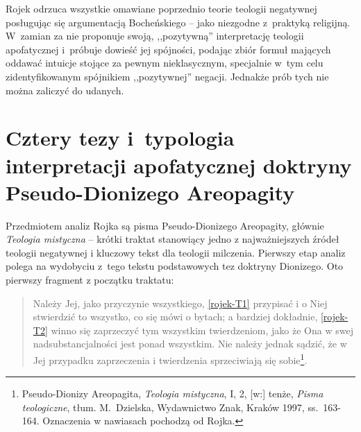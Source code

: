 Rojek odrzuca wszystkie omawiane poprzednio teorie teologii negatywnej posługując się argumentacją Bocheńskiego -- jako niezgodne z~praktyką religijną. W~zamian za nie proponuje swoją, ,,pozytywną'' interpretację teologii apofatycznej i~próbuje dowieść jej spójności, podając zbiór formuł mających oddawać intuicje stojące za pewnym nieklasycznym, specjalnie w~tym celu zidentyfikowanym spójnikiem ,,pozytywnej'' negacji. Jednakże prób tych nie można zaliczyć do udanych.







\section{Cztery tezy i~typologia interpretacji apofatycznej doktryny Pseudo-Dionizego Areopagity}

Przedmiotem analiz Rojka są pisma Pseudo-Dionizego Areopagity, głównie
\textit{Teologia mistyczna} -- krótki traktat stanowiący jedno z najważniejszych
źródeł teologii negatywnej i kluczowy tekst dla teologii milczenia.
Pierwszy etap analiz polega na wydobyciu z~tego tekstu podstawowych tez
doktryny Dionizego. Oto pierwszy fragment z początku traktatu:

\begin{quote}
    Należy Jej, jako przyczynie wszystkiego, \eqref{rojek-T1} przypisać i o Niej
stwierdzić to wszystko, co się mówi o bytach; a bardziej dokładnie,
\eqref{rojek-T2} winno się zaprzeczyć tym wszystkim twierdzeniom, jako że Ona w
swej nadsubstancjalności jest ponad wszystkim. Nie należy jednak
sądzić, że w Jej przypadku zaprzeczenia i twierdzenia sprzeciwiają się
sobie\footnote{
Pseudo-Dionizy Areopagita, \textit{Teologia mistyczna}, I, 2, [w:] tenże, \textit{Pisma teologiczne}, tłum. M.~Dzielska, Wydawnictwo Znak, Kraków 1997, ss.~163-164.
Oznaczenia w nawiasach pochodzą od Rojka.}.
\end{quote}





